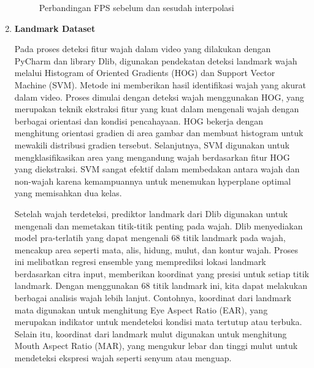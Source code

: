 \begin{enumerate}
\begin{figure}[htbp]
{    \label{fig:FPS2}
  }
  \caption{Perbandingan FPS sebelum dan sesudah interpolasi}
  \label{fig:FPS_comparison}
\end{figure}

  \item {\textbf{Landmark Dataset}}
  
  Pada proses deteksi fitur wajah dalam video yang dilakukan dengan PyCharm dan library Dlib, digunakan pendekatan deteksi landmark wajah melalui Histogram of Oriented Gradients (HOG) dan Support Vector Machine (SVM). Metode ini memberikan hasil identifikasi wajah yang akurat dalam video. Proses dimulai dengan deteksi wajah menggunakan HOG, yang merupakan teknik ekstraksi fitur yang kuat dalam mengenali wajah dengan berbagai orientasi dan kondisi pencahayaan. HOG bekerja dengan menghitung orientasi gradien di area gambar dan membuat histogram untuk mewakili distribusi gradien tersebut. Selanjutnya, SVM digunakan untuk mengklasifikasikan area yang mengandung wajah berdasarkan fitur HOG yang diekstraksi. SVM sangat efektif dalam membedakan antara wajah dan non-wajah karena kemampuannya untuk menemukan hyperplane optimal yang memisahkan dua kelas.

Setelah wajah terdeteksi, prediktor landmark dari Dlib digunakan untuk mengenali dan memetakan titik-titik penting pada wajah. Dlib menyediakan model pra-terlatih yang dapat mengenali 68 titik landmark pada wajah, mencakup area seperti mata, alis, hidung, mulut, dan kontur wajah. Proses ini melibatkan regresi ensemble yang memprediksi lokasi landmark berdasarkan citra input, memberikan koordinat yang presisi untuk setiap titik landmark. Dengan menggunakan 68 titik landmark ini, kita dapat melakukan berbagai analisis wajah lebih lanjut. Contohnya, koordinat dari landmark mata digunakan untuk menghitung Eye Aspect Ratio (EAR), yang merupakan indikator untuk mendeteksi kondisi mata tertutup atau terbuka. Selain itu, koordinat dari landmark mulut digunakan untuk menghitung Mouth Aspect Ratio (MAR), yang mengukur lebar dan tinggi mulut untuk mendeteksi ekspresi wajah seperti senyum atau menguap.


\end{enumerate}
